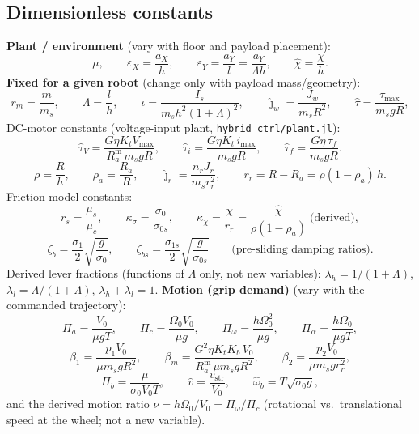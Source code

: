 \documentclass[11pt]{article}
\begin{document}
\subsection*{Dimensionless constants}
\textbf{Plant / environment} (vary with floor and payload placement):
\begin{equation}
\mu, \qquad
\varepsilon_X = \frac{a_X}{h}, \qquad
\varepsilon_Y = \frac{a_Y}{l} = \frac{a_Y}{\Lambda h}, \qquad
\hat\chi = \frac{\chi}{h}.
\end{equation}
\textbf{Fixed for a given robot} (change only with payload mass/geometry):
\begin{equation}
r_m = \frac{m}{m_s}, \qquad
\Lambda = \frac{l}{h}, \qquad
\iota = \frac{I_s}{m_s h^2(1+\Lambda)^2}, \qquad
\hat\jmath_w = \frac{J_w}{m_s R^2}, \qquad
\hat\tau = \frac{\tau_{\max}}{m_s g R},
\end{equation}
DC-motor constants (voltage-input plant, \texttt{hybrid\_ctrl/plant.jl}):
\begin{equation}
\hat\tau_V = \frac{G\eta K_t V_{\max}}{R_a^{\mathrm{m}}\,m_s g R}, \qquad
\hat\tau_i = \frac{G\eta K_t\, i_{\max}}{m_s g R}, \qquad
\hat\tau_f = \frac{G\eta\,\tau_f}{m_s g R}.
\end{equation}
\begin{equation}
\rho = \frac{R}{h}, \qquad
\rho_a = \frac{R_a}{R}, \qquad
\hat\jmath_r = \frac{n_r J_r}{m_s r_r^2},
\qquad r_r = R - R_a = \rho(1-\rho_a)\,h.
\end{equation}
Friction-model constants:
\begin{equation}
r_s = \frac{\mu_s}{\mu_c}, \qquad
\kappa_\sigma = \frac{\sigma_0}{\sigma_{0s}}, \qquad
\kappa_\chi = \frac{\chi}{r_r} = \frac{\hat\chi}{\rho(1-\rho_a)}\ \text{(derived)},
\end{equation}
\begin{equation}
\zeta_b = \frac{\sigma_1}{2}\sqrt{\frac{g}{\sigma_0}}, \qquad
\zeta_{bs} = \frac{\sigma_{1s}}{2}\sqrt{\frac{g}{\sigma_{0s}}}
\qquad \text{(pre-sliding damping ratios)}.
\end{equation}
Derived lever fractions (functions of $\Lambda$ only, not new variables):
$\lambda_h = 1/(1+\Lambda)$, $\lambda_l = \Lambda/(1+\Lambda)$, $\lambda_h + \lambda_l = 1$.
\textbf{Motion (grip demand)} (vary with the commanded trajectory):
\begin{equation}
\Pi_a = \frac{V_0}{\mu g T},\qquad
\Pi_c = \frac{\Omega_0 V_0}{\mu g},\qquad
\Pi_\omega = \frac{h\Omega_0^2}{\mu g},\qquad
\Pi_\alpha = \frac{h\Omega_0}{\mu g T},
\end{equation}
\begin{equation}
\beta_1 = \frac{p_1 V_0}{\mu m_s g R^2},\qquad
\beta_m = \frac{G^2\eta K_t K_b\,V_0}{R_a^{\mathrm{m}}\,\mu m_s g R^2},\qquad
\beta_2 = \frac{p_2 V_0}{\mu m_s g r_r^2},
\end{equation}
\begin{equation}
\Pi_b = \frac{\mu}{\sigma_0 V_0 T},\qquad
\hat v = \frac{v_{\mathrm{str}}}{V_0},\qquad
\hat\omega_b = T\sqrt{\sigma_0 g},
\end{equation}
and the derived motion ratio $\nu = h\Omega_0/V_0 = \Pi_\omega/\Pi_c$
(rotational vs.\ translational speed at the wheel; not a new variable).
\end{document}
